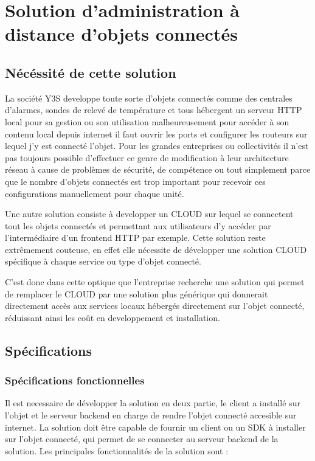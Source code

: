 \chapter{Solution d'administration à distance d'objets connectés}
\label{sec:content}

\section{Nécéssité de cette solution}

La société Y3S developpe toute sorte d'objets connectés comme des centrales d'alarmes, sondes de relevé de température et tous hébergent un serveur HTTP local pour sa gestion ou son utilisation malheureusement pour accéder à son contenu local depuis internet il faut ouvrir les ports et configurer les routeurs sur lequel j'y est connecté l'objet. Pour les grandes entreprises ou collectivités il n'est pas toujours possible d'effectuer ce genre de modification à leur architecture réseau à cause de problèmes de sécurité, de compétence ou tout simplement parce que le nombre d'objets connectés est trop important pour recevoir ces configurations manuellement pour chaque unité.

Une autre solution consiste à developper un CLOUD sur lequel se connectent tout les objets connectés et permettant aux utilisateurs d'y accéder par l'intermédiaire d'un frontend HTTP par exemple. Cette solution reste extrêmement couteuse, en effet elle nécessite de développer une solution CLOUD spécifique à chaque service ou type d'objet connecté.

C'est donc dans cette optique que l'entreprise recherche une solution qui permet de remplacer le CLOUD par une solution plus générique qui donnerait directement accès aux services locaux hébergés directement sur l'objet connecté, réduissant ainsi les coût en developpement et installation.

\section{Spécifications}

\subsection{Spécifications fonctionnelles}

Il est necessaire de développer la solution en deux partie, le client a installé sur l'objet et le serveur backend en charge de rendre l'objet connecté accesible sur internet. La solution doit être capable de fournir un client ou un SDK à installer sur l'objet connecté, qui permet de se connecter au serveur backend de la solution. Les principales fonctionnalités de la solution sont :

